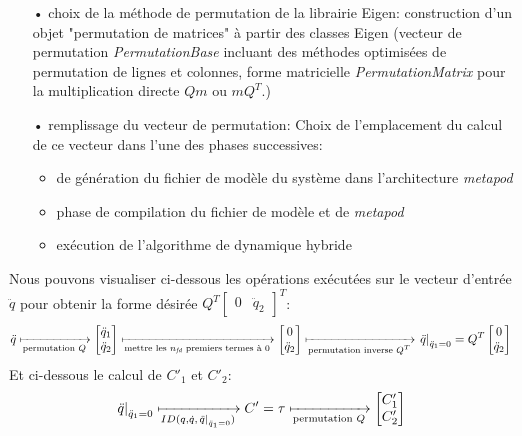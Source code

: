 \documentclass{report}
\begin{document}
\begin{itemize}
  \item[•] choix de la méthode de permutation de la librairie Eigen: construction d'un objet "permutation de matrices" à partir des classes Eigen (vecteur de permutation \emph{PermutationBase} incluant des méthodes optimisées de permutation de lignes et colonnes, forme matricielle \emph{PermutationMatrix} pour la multiplication directe $Qm$ ou $mQ^T$.)
  \item[•] remplissage du vecteur de permutation: Choix de l'emplacement du calcul de ce vecteur dans l'une des phases successives:
  \begin{itemize}
    \item de génération du fichier de modèle du système dans l'architecture \emph{metapod}
    \item phase de compilation du fichier de modèle et de \emph{metapod}
    \item exécution de l'algorithme de dynamique hybride
  \end{itemize}
\end{itemize}
\medskip
Nous pouvons visualiser ci-dessous les opérations exécutées sur le vecteur d'entrée $\ddot{q}$ pour obtenir la forme désirée \(Q^T \begin{bmatrix} 0 & \ddot{q}_2 \end{bmatrix}^T\):
\begin{equation*}
\ddot{q} \xmapsto[\textnormal{permutation $Q$}]{} 
\begin{bmatrix}
  \ddot{q}_1 \\
  \ddot{q}_2
\end{bmatrix}
\xmapsto[\textnormal{mettre les $n_{\emph{fd}}$ premiers termes à 0}]{} 
\begin{bmatrix}
  0 \\
  \ddot{q}_2
\end{bmatrix}
\xmapsto[\textnormal{permutation inverse $Q^T$}]{} 
\left. \ddot{q} \right\vert_{\ddot{q}_1=0} = Q^T
\begin{bmatrix}
  0 \\
  \ddot{q}_2
\end{bmatrix}
\end{equation*}
\medskip
Et ci-dessous le calcul de $C'_1$ et $C'_2$:
\begin{equation*}
\left. \ddot{q} \right\vert_{\ddot{q}_1=0} \xmapsto[ID(q,\dot{q},\left. \ddot{q} \right\vert_{\ddot{q}_1=0})]{} C'=\tau
\xmapsto[\textnormal{permutation $Q$}]{} 
\begin{bmatrix}
  C'_1 \\
  C'_2
\end{bmatrix}
\end{equation*}
\end{document}
